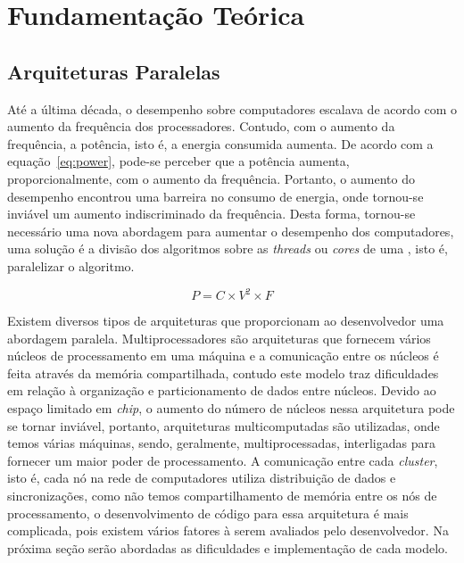 \chapter{Fundamentação Teórica}


\section{Arquiteturas Paralelas}
Até a última década, o desempenho sobre computadores escalava de acordo com o
aumento da frequência dos processadores. Contudo, com o aumento da frequência,
a potência, isto é, a energia consumida aumenta. De acordo com a
equação~\eqref{eq:power}, pode-se perceber que a potência aumenta,
proporcionalmente, com o aumento da frequência. Portanto, o aumento do
desempenho encontrou uma barreira no consumo de energia, onde tornou-se inviável
um aumento indiscriminado da frequência. Desta forma, tornou-se necessário uma
nova abordagem para aumentar o desempenho dos computadores, uma solução é a
divisão dos algoritmos sobre as \textit{threads} ou \textit{cores} de uma \cpu,
isto é, paralelizar o algoritmo.

\begin{equation}\label{eq:power}
	P = C \times V^2 \times F
\end{equation}

Existem diversos tipos de arquiteturas que proporcionam ao desenvolvedor uma
abordagem paralela. Multiprocessadores são arquiteturas que fornecem vários
núcleos de processamento em uma máquina e a comunicação entre os núcleos é feita
através da memória compartilhada, contudo este modelo traz dificuldades em
relação à organização e particionamento de dados entre núcleos. Devido ao espaço
limitado em \textit{chip}, o aumento do número de núcleos nessa arquitetura pode
se tornar inviável, portanto, arquiteturas multicomputadas são utilizadas, onde
temos várias máquinas, sendo, geralmente, multiprocessadas, interligadas para
fornecer um maior poder de processamento. A comunicação entre cada
\textit{cluster}, isto é, cada nó na rede de computadores utiliza distribuição
de dados e sincronizações, como não temos compartilhamento de memória entre os
nós de processamento, o desenvolvimento de código para essa arquitetura é mais
complicada, pois existem vários fatores à serem avaliados pelo desenvolvedor. Na
próxima seção serão abordadas as dificuldades e implementação de cada modelo.



